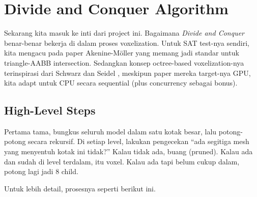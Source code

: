 \documentclass[11pt,a4paper]{article}
\begin{document}
\section{Divide and Conquer Algorithm}\label{sec:algo}

Sekarang kita masuk ke inti dari project ini. Bagaimana \textit{Divide and Conquer} benar-benar
bekerja di dalam proses voxelization. Untuk SAT test-nya sendiri, kita mengacu pada paper
Akenine-M\"oller \cite{akenine2001}
yang memang jadi standar untuk triangle-AABB intersection. Sedangkan konsep octree-based
voxelization-nya terinspirasi dari Schwarz dan
Seidel \cite{schwarz2010},
meskipun paper mereka target-nya GPU, kita adapt untuk CPU secara sequential
(plus concurrency sebagai bonus).

\subsection{High-Level Steps}

Pertama tama, bungkus seluruh model dalam satu kotak besar, lalu potong-potong
secara rekursif. Di setiap level, lakukan pengecekan ``ada segitiga mesh yang menyentuh kotak ini
tidak?'' Kalau tidak ada, buang (pruned). Kalau ada dan sudah di level terdalam, itu voxel. Kalau ada
tapi belum cukup dalam, potong lagi jadi 8 child.

Untuk lebih detail, prosesnya seperti berikut ini.
\end{document}
